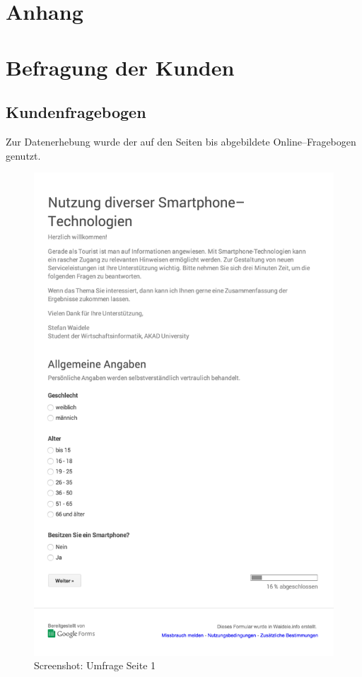 
\appendix
\section*{Anhang}

\section*{Befragung der Kunden}
\label{sec:kundenbefragung}
\subsection*{Kundenfragebogen}

Zur Datenerhebung wurde der auf den Seiten \pageref{pic:us1} bis \pageref{pic:us6} abgebildete Online–Fragebogen genutzt. 

\begin{figure}[H]
\begin{center}
\includegraphics[width=.6\textwidth]{Umfrage-S1.png}
\caption{Screenshot: Umfrage Seite 1}
\label{pic:us1}
\end{center}
\end{figure}

